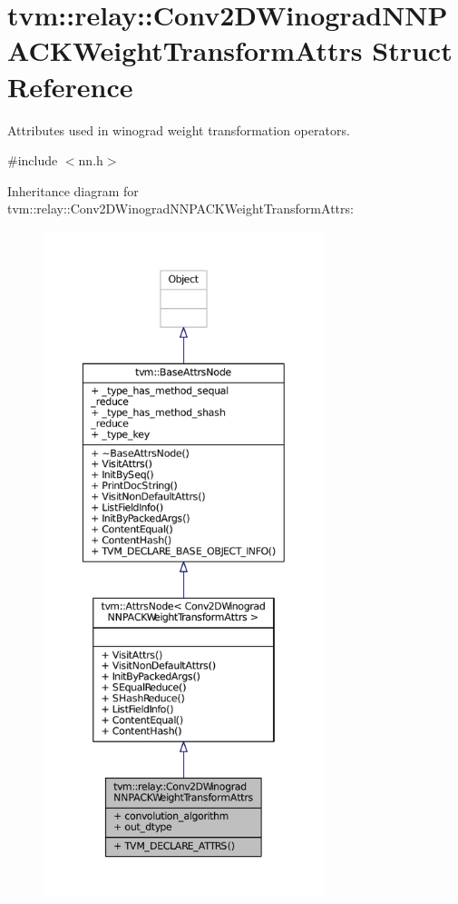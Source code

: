 \hypertarget{structtvm_1_1relay_1_1Conv2DWinogradNNPACKWeightTransformAttrs}{}\section{tvm\+:\+:relay\+:\+:Conv2\+D\+Winograd\+N\+N\+P\+A\+C\+K\+Weight\+Transform\+Attrs Struct Reference}
\label{structtvm_1_1relay_1_1Conv2DWinogradNNPACKWeightTransformAttrs}


Attributes used in winograd weight transformation operators.  




{\ttfamily \#include $<$nn.\+h$>$}



Inheritance diagram for tvm\+:\+:relay\+:\+:Conv2\+D\+Winograd\+N\+N\+P\+A\+C\+K\+Weight\+Transform\+Attrs\+:
\nopagebreak
\begin{figure}[H]
\begin{center}
\leavevmode
\includegraphics[height=550pt]{structtvm_1_1relay_1_1Conv2DWinogradNNPACKWeightTransformAttrs__inherit__graph}
\end{center}
\end{figure}


